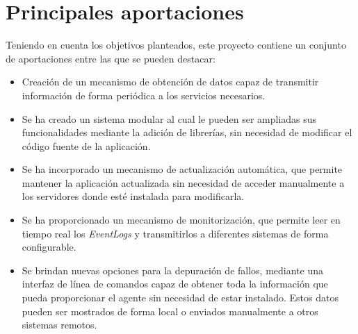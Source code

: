 \label{sec:conc}
\section{Principales aportaciones}
    Teniendo en cuenta los objetivos planteados, este proyecto contiene un conjunto de aportaciones entre las que se pueden destacar:
    
    \begin{itemize}
        \item Creación de un mecanismo de obtención de datos capaz de transmitir información de forma periódica a los servicios necesarios.
        
        \item Se ha creado un sistema modular al cual le pueden ser ampliadas sus funcionalidades mediante la adición de librerías, sin necesidad de modificar el código fuente de la aplicación.
        
        \item Se ha incorporado un mecanismo de actualización automática, que permite mantener la aplicación actualizada sin necesidad de acceder manualmente a los servidores donde esté instalada para modificarla.
        
        \item Se ha proporcionado un mecanismo de monitorización, que permite leer en tiempo real los \textit{EventLogs} y transmitirlos a diferentes sistemas de forma configurable.
        
        \item Se brindan nuevas opciones para la depuración de fallos, mediante una interfaz de línea de comandos capaz de obtener toda la información que pueda proporcionar el agente sin necesidad de estar instalado. Estos datos pueden ser mostrados de forma local o enviados manualmente a otros sistemas remotos.
    \end{itemize}






